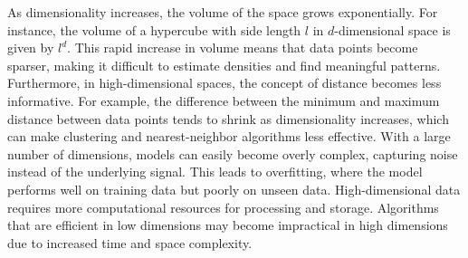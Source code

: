 As dimensionality increases, the volume of the space grows exponentially. For instance, the volume of a hypercube with side length $l$ in $d$-dimensional space is given by $l^d$. This rapid increase in volume means that data points become sparser, making it difficult to estimate densities and find meaningful patterns. Furthermore, in high-dimensional spaces, the concept of distance becomes less informative. For example, the difference between the minimum and maximum distance between data points tends to shrink as dimensionality increases, which can make clustering and nearest-neighbor algorithms less effective. With a large number of dimensions, models can easily become overly complex, capturing noise instead of the underlying signal. This leads to overfitting, where the model performs well on training data but poorly on unseen data. High-dimensional data requires more computational resources for processing and storage. Algorithms that are efficient in low dimensions may become impractical in high dimensions due to increased time and space complexity.


